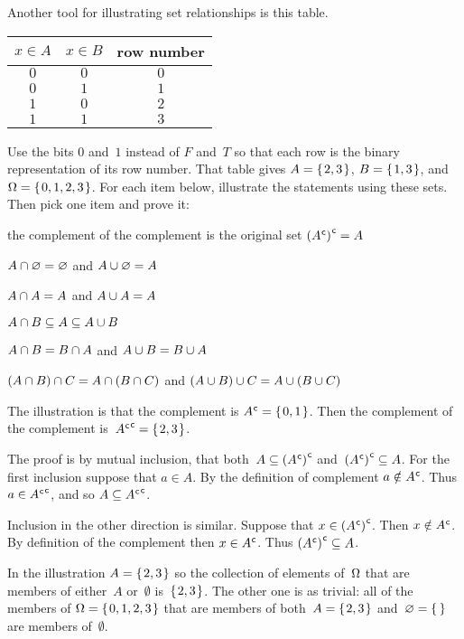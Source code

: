 \documentclass{ibl}  %
\begin{document}
\begin{ex}
Another tool for illustrating set relationships is this table.
\begin{center} \small
  \begin{tabular}{cc|c}
    $x\in A$  &$x\in B$  &row number \\ \hline
    $0$       &$0$       &$0$  \\
    $0$       &$1$       &$1$  \\
    $1$       &$0$       &$2$  \\
    $1$       &$1$       &$3$  
  \end{tabular}
\end{center}
Use the bits $0$ and~$1$ instead of $F$ and~$T$ so that each
row is the binary representation of its row number.
That table gives $A=\mbox{$\{\hspace{0.1em}2,3\hspace{0.1em}\}$}$, $B=\mbox{$\{\hspace{0.1em}1,3\hspace{0.1em}\}$}$, 
and~$\Omega=\mbox{$\{\hspace{0.1em}0,1,2,3\hspace{0.1em}\}$}$.
For each item below, illustrate the statements using these sets.
Then pick one item and prove it:
\begin{items}
\item the complement of the complement is the original set
  ${({A}^{\mspace{1mu}\mathsf{c}})}^{\mspace{1mu}\mathsf{c}}=A$  
\item $A\cap\varnothing=\varnothing$ and $A\cup\varnothing=A$  
\item {} $A\cap A=A$ and $A\cup A=A$    
\item $A\cap B\subseteq A\subseteq A\cup B$  
\item {}
   $A\cap B=B\cap A$ and
   $A\cup B=B\cup A$ 
\item {} 
  $(A\cap B)\cap C=A\cap (B\cap C)$
  and
  $(A\cup B)\cup C=A\cup (B\cup C)$ 
\end{items}
\begin{ans}
\begin{items}
\item  The illustration is that the complement is 
  ${A}^{\mspace{1mu}\mathsf{c}}=\mbox{$\{\hspace{0.1em}0,1\hspace{0.1em}\}$}$.
  Then the complement of the complement is~${{A}^{\mspace{1mu}\mathsf{c}}}^{\mspace{1mu}\mathsf{c}}=\mbox{$\{\hspace{0.1em}2,3\hspace{0.1em}\}$}$.
  
  The proof 
  is by mutual inclusion, that both~$A\subseteq{({A}^{\mspace{1mu}\mathsf{c}})}^{\mspace{1mu}\mathsf{c}}$
  and~${({A}^{\mspace{1mu}\mathsf{c}})}^{\mspace{1mu}\mathsf{c}}\subseteq A$.
  For the first inclusion suppose that $a\in A$.
  By the definition of complement $a\notin{A}^{\mspace{1mu}\mathsf{c}}$.
  Thus $a\in{{A}^{\mspace{1mu}\mathsf{c}}}^{\mspace{1mu}\mathsf{c}}$,
  and so $A\subseteq{{A}^{\mspace{1mu}\mathsf{c}}}^{\mspace{1mu}\mathsf{c}}$.

  Inclusion in the other direction is similar.
  Suppose that $x\in{({A}^{\mspace{1mu}\mathsf{c}})}^{\mspace{1mu}\mathsf{c}}$.
  Then $x\notin{A}^{\mspace{1mu}\mathsf{c}}$.
  By definition of the complement then $x\in{A}^{\mspace{1mu}\mathsf{c}}$.
  Thus ${({A}^{\mspace{1mu}\mathsf{c}})}^{\mspace{1mu}\mathsf{c}}\subseteq A$. 
\item In the illustration $A=\mbox{$\{\hspace{0.1em}2,3\hspace{0.1em}\}$}$ so the collection of
  elements of~$\Omega$ that are members of either~$A$ or~$\emptyset$
  is~$\mbox{$\{\hspace{0.1em}2,3\hspace{0.1em}\}$}$.
  The other one is as trivial: all of the members of 
  $\Omega=\mbox{$\{\hspace{0.1em}0,1,2,3\hspace{0.1em}\}$}$ that are members of both~$A=\mbox{$\{\hspace{0.1em}2,3\hspace{0.1em}\}$}$
  and~$\emptyset=\set{}$ are members of~$\emptyset$.


\end{items}
\end{ans}
\end{ex}
\end{document}
